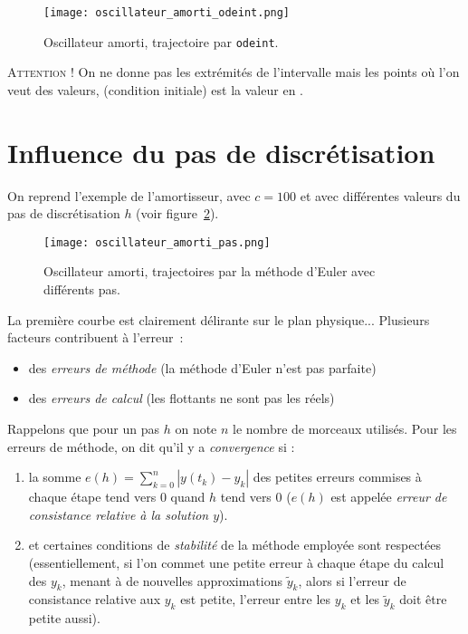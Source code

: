
\begin{figure}[!h]
    \begin{center}
        \texttt{[image: oscillateur\_amorti\_odeint.png]}
        \caption{Oscillateur amorti, trajectoire par \texttt{odeint}.}
        \label{11:fig:oscillateur_amorti_odeint}
    \end{center}
\end{figure}
\textsc{Attention !} On ne donne pas les extrémités de l'intervalle mais les points  où l'on veut des valeurs,  (condition initiale) est la valeur en
  .



\section{Influence du pas de discrétisation}
On reprend l'exemple de l'amortisseur, avec $c=100$ et avec
différentes valeurs du pas de discrétisation $h$ (voir figure~\ref{11:fig:oscillateur_amorti_pas}).

\begin{figure}[!h]
    \begin{center}
        \texttt{[image: oscillateur\_amorti\_pas.png]}
        \caption{Oscillateur amorti, trajectoires par la méthode d'Euler avec différents pas.}
        \label{11:fig:oscillateur_amorti_pas}
    \end{center}
\end{figure}

La première courbe est clairement délirante sur le plan physique...
Plusieurs facteurs contribuent à l'erreur~:

\begin{itemize}
\item des \emph{erreurs de méthode} (la méthode d'Euler n'est pas parfaite)
\item des \emph{erreurs de calcul} (les flottants ne sont pas les réels)
\end{itemize}

Rappelons que pour un pas $h$ on note $n$ le nombre de morceaux utilisés. Pour les erreurs de méthode, on dit qu'il y a \emph{convergence} si :
\begin{enumerate}
\item la somme $e(h)=\displaystyle\sum_{k=0}^n |y(t_k)-y_k|$ des petites erreurs 
commises à 
chaque étape tend vers $0$ quand $h$ tend vers $0$ ($e(h)$ est appelée 
  \emph{erreur de consistance relative à la solution $y$}).
\item et certaines conditions de \emph{stabilité} de la méthode employée sont
  respectées (essentiellement, si l'on commet une petite erreur à chaque étape du calcul des $y_k$, 
  menant à de nouvelles approximations $\tilde{y}_k$, alors si l'erreur de consistance relative aux $y_k$
  est petite, l'erreur entre les $y_k$ et les $\tilde{y}_k$ doit être petite aussi).
\end{enumerate}

